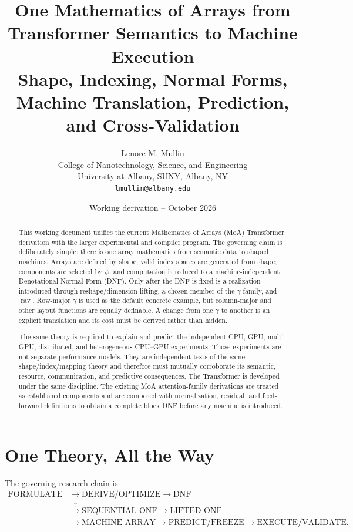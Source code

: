 \documentclass[11pt]{article}
\title{\textbf{One Mathematics of Arrays from Transformer Semantics to Machine Execution}\\
\large Shape, Indexing, Normal Forms, Machine Translation, Prediction, and Cross-Validation}
\author{Lenore M. Mullin\\
College of Nanotechnology, Science, and Engineering\\
University at Albany, SUNY, Albany, NY\\
\texttt{lmullin@albany.edu}}
\date{Working derivation -- October 2026}
\newcommand{\DNF}{\mathrm{DNF}}
\newcommand{\rav}{\operatorname{rav}}
\begin{document}
\maketitle

\begin{abstract}
This working document unifies the current Mathematics of Arrays (MoA) Transformer derivation
with the larger experimental and compiler program.  The governing claim is deliberately simple:
there is one array mathematics from semantic data to shaped machines.  Arrays are defined by
shape; valid index spaces are generated from shape; components are selected by $\psi$; and
computation is reduced to a machine-independent Denotational Normal Form (DNF).  Only after the
DNF is fixed is a realization introduced through reshape/dimension lifting, a chosen member of
the $\gamma$ family, and \(\rav\).  Row-major $\gamma$ is used as the default concrete example,
but column-major and other layout functions are equally definable.  A change from one $\gamma$
to another is an explicit translation and its cost must be derived rather than hidden.

The same theory is required to explain and predict the independent CPU, GPU, multi-GPU,
distributed, and heterogeneous CPU--GPU experiments.  Those experiments are not separate
performance models.  They are independent tests of the same shape/index/mapping theory and
therefore must mutually corroborate its semantic, resource, communication, and predictive
consequences.  The Transformer is developed under the same discipline.  The existing MoA
attention-family derivations are treated as established components and are composed with
normalization, residual, and feed-forward definitions to obtain a complete block DNF before any
machine is introduced.
\end{abstract}

\section{One Theory, All the Way}

The governing research chain is
\[
\boxed{\begin{aligned}
\text{FORMULATE}&\rightarrow\text{DERIVE/OPTIMIZE}\rightarrow\DNF\\
&\xrightarrow{\gamma}\text{SEQUENTIAL ONF}\rightarrow\text{LIFTED ONF}\\
&\rightarrow\text{MACHINE ARRAY}\rightarrow\text{PREDICT/FREEZE}\rightarrow\text{EXECUTE/VALIDATE}.
\end{aligned}}
\]
\end{document}
